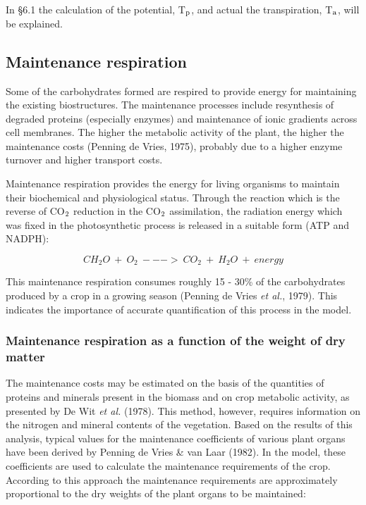 In \S 6.1 the calculation of the potential, T$_{{\rm p}}$, and actual the transpiration, 
T$_{{\rm a}}$, will be ex\-plained.

\subsection{Maintenance respiration}

Some of the carbohydrates formed are respired to provide energy for maintaining the
existing biostructures. The maintenance processes include resynthesis of degraded proteins
(especially enzymes) and maintenance of ionic gradients across cell mem\-branes. The
higher the metabolic activity of the plant, the higher the mainte\-nance costs (Penning de
Vries, 1975), probably due to a higher enzyme turnover and higher transport costs.

Maintenance respiration provides the energy for living organisms to maintain their
biochemical and physiological status. Through the reaction which is the reverse of CO$_{{\rm 2}}$
reduction in the CO$_{{\rm 2}}$ assimila\-tion, the radiation energy which was fixed in the
photosyn\-thetic process is released in a suitable form (ATP and NADPH):

\begin{equation}
CH _{2} O ~+~ O _{2} ~--->~ CO _{2} ~+~ H _{2} O ~+~ energy
\end{equation}

This maintenance respiration consumes roughly 15 - 30\% of the carbohy\-drates produced
by a crop in a growing season (Penning de Vries {\it et al.}, 1979). This indicates the
importance of accurate quantification of this process in the model.

\subsubsection{Maintenance respiration as a function of the weight of dry matter}
The maintenance costs may be estimated on the basis of the quantities of proteins and
minerals present in the biomass and on crop metabolic activity, as presented by De Wit {\it et
al.} (1978). This method, however, requires information on the nitrogen and mineral
contents of the vegetation.
Based on the results of this analysis, typical values for the maintenance coefficients of
various plant organs have been derived by Penning de Vries \& van Laar (1982).
In the model, these coefficients are used to calculate the maintenance requirements of the
crop. According to this approach the maintenance requirements are approxi\-mately 
propor\-tional to the dry weights of the plant organs to be maintained: 


